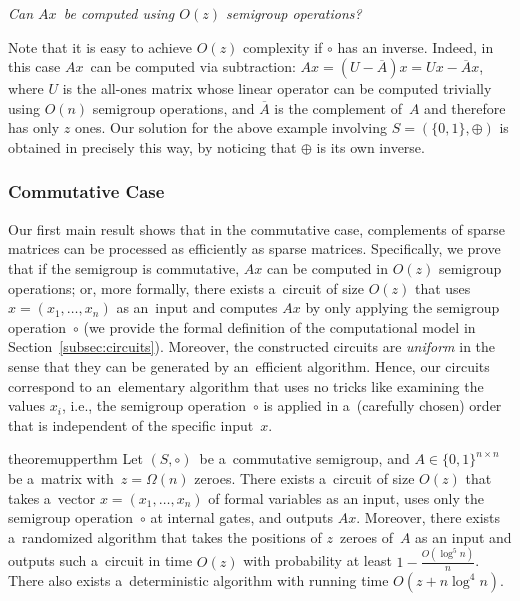\documentclass{toc}
\begin{document}
\vspace{2mm}
\emph{Can $Ax$~be computed using $O(z)$ semigroup operations?}
\vspace{2mm}

\noindent
Note that it is easy to achieve $O(z)$ complexity if $\circ$ has an inverse.
Indeed, in this case $Ax$~can be computed via subtraction:
$Ax = (U-\overline{A})x = Ux - \overline{A}x$, where $U$ is the all-ones matrix
whose linear operator can be computed trivially using $O(n)$ semigroup
operations, and $\overline{A}$ is the complement of~$A$ and therefore has only
$z$ ones. Our solution for the above example involving $S=(\{0,1\}, \oplus)$
is obtained in precisely this way, by noticing that $\oplus$ is its own inverse.

\subsubsection{Commutative Case}
Our first main result shows that in the commutative case, complements
of sparse matrices can be processed as
efficiently as sparse matrices. Specifically, we prove
that if the semigroup is commutative, $Ax$ can be computed in $O(z)$ semigroup
operations; or, more formally, there exists
a~circuit of size $O(z)$ that uses $x=(x_1, \dotsc, x_n)$ as
an~input and computes $Ax$ by only applying the semigroup
operation~$\circ$ (we provide the formal definition of the
computational model in Section~\ref{subsec:circuits}). Moreover,
the constructed circuits are \emph{uniform} in the sense that they
can be generated by an~efficient algorithm. Hence, our circuits
correspond to an~elementary algorithm that uses no tricks like examining the
values $x_i$, i.e., the semigroup operation~$\circ$ is applied in a~(carefully
chosen) order that is independent of the specific input~$x$.

\begin{restatable}{theorem}{upperthm}
\label{thm:upperbound}
Let $(S, \circ)$~be a~commutative semigroup,
and $A \in \{0,1\}^{n \times n}$ be a~matrix
with~$z=\Omega(n)$ zeroes.
There exists a~circuit of size $O(z)$ that takes
a~vector $x = (x_1,\ldots, x_n)$ of formal variables as an input,
uses only the semigroup operation~$\circ$ at internal gates,
and outputs $Ax$. Moreover, there exists a~randomized
algorithm that takes the positions of $z$~zeroes of~$A$
as an input and outputs such a~circuit in time $O(z)$
with probability at least $1-\frac{O(\log^5n)}{n}$. There also
exists a~deterministic algorithm with running time $O(z+n\log^4n)$.
\end{restatable}
\end{document}
